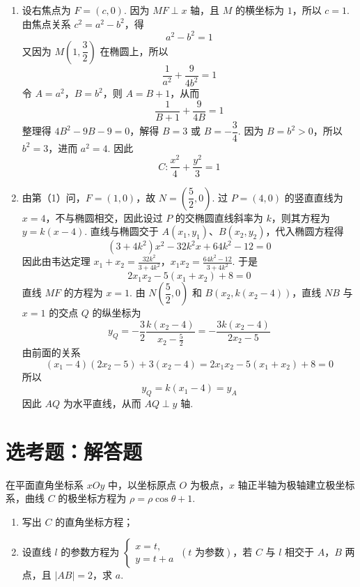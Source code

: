 \begin{solution}
\begin{enumerate}
\item 设右焦点为 \(F=(c,0)\). 因为 \(MF\perp x\) 轴，且 \(M\) 的横坐标为 \(1\)，所以 \(c=1\). 由焦点关系 \(c^2=a^2-b^2\)，得
\[
a^2-b^2=1
\]
又因为 \(M\left(1,\dfrac32\right)\) 在椭圆上，所以
\[
\frac1{a^2}+\frac9{4b^2}=1
\]
令 \(A=a^2\)，\(B=b^2\)，则 \(A=B+1\)，从而
\[
\frac1{B+1}+\frac9{4B}=1
\]
整理得 \(4B^2-9B-9=0\)，解得 \(B=3\) 或 \(B=-\dfrac34\). 因为 \(B=b^2>0\)，所以 \(b^2=3\)，进而 \(a^2=4\). 因此
\[
C:\frac{x^2}{4}+\frac{y^2}{3}=1
\]
\item 由第（1）问，\(F=(1,0)\)，故 \(N=\left(\dfrac52,0\right)\). 过 \(P=(4,0)\) 的竖直直线为 \(x=4\)，不与椭圆相交，因此设过 \(P\) 的交椭圆直线斜率为 \(k\)，则其方程为 \(y=k(x-4)\). 直线与椭圆交于 \(A(x_1,y_1)\)、\(B(x_2,y_2)\)，代入椭圆方程得
\[
(3+4k^2)x^2-32k^2x+64k^2-12=0
\]
因此由韦达定理
\(x_1+x_2=\frac{32k^2}{3+4k^2}\)，\(x_1x_2=\frac{64k^2-12}{3+4k^2}\).
于是
\[
2x_1x_2-5(x_1+x_2)+8=0
\]
直线 \(MF\) 的方程为 \(x=1\). 由 \(N\left(\dfrac52,0\right)\) 和 \(B\left(x_2,k(x_2-4)\right)\)，直线 \(NB\) 与 \(x=1\) 的交点 \(Q\) 的纵坐标为
\[
y_Q=-\frac32\frac{k(x_2-4)}{x_2-\frac52}=-\frac{3k(x_2-4)}{2x_2-5}
\]
由前面的关系
\[
(x_1-4)(2x_2-5)+3(x_2-4)=2x_1x_2-5(x_1+x_2)+8=0
\]
所以
\[
y_Q=k(x_1-4)=y_A
\]
因此 \(AQ\) 为水平直线，从而 \(AQ\perp y\) 轴.
\end{enumerate}
\end{solution}

\section{选考题：解答题}

\begin{problem}
在平面直角坐标系 \(xOy\) 中，以坐标原点 \(O\) 为极点，\(x\) 轴正半轴为极轴建立极坐标系，曲线 \(C\) 的极坐标方程为 \(\rho=\rho\cos\theta+1\).
\begin{enumerate}
\item 写出 \(C\) 的直角坐标方程；
\item 设直线 \(l\) 的参数方程为 \(\begin{cases}
x=t,\\
y=t+a
\end{cases}\ (t\text{ 为参数})\)，若 \(C\) 与 \(l\) 相交于 \(A\)，\(B\) 两点，且 \(|AB|=2\)，求 \(a\).
\end{enumerate}
\end{problem}

